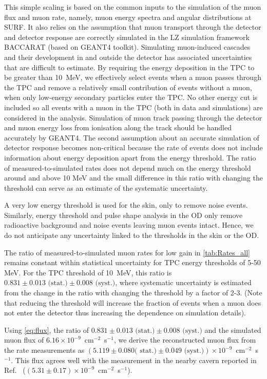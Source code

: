 This simple scaling is based on the common inputs to the simulation of the muon flux and muon rate, namely, muon energy spectra and angular distributions at SURF. It also relies on the assumption that muon transport through the detector and detector response are correctly simulated in the LZ simulation framework BACCARAT (based on GEANT4 toolkit). Simulating muon-induced cascades and their development in and outside the detector has associated uncertainties that are difficult to estimate. By requiring the energy deposition in the TPC to be greater than 10~MeV, we effectively select events when a muon passes through the TPC and remove a relatively small contribution of events without a muon, when only low-energy secondary particles enter the TPC. No other energy cut is included so all events with a muon in the TPC (both in data and simulations) are considered in the analysis. Simulation of muon track passing through the detector and muon energy loss from ionisation along the track should be handled accurately by GEANT4. The second assumption about an accurate simulation of detector response becomes non-critical because the rate of events does not include information about energy deposition apart from the energy threshold. The ratio of measured-to-simulated rates does not depend much on the energy threshold around and above 10 MeV and the small difference in this ratio with changing the threshold can serve as an estimate of the systematic uncertainty. 

A very low energy threshold is used for the skin, only to remove noise events. Similarly, energy threshold and pulse shape analysis in the OD only remove radioactive background and noise events leaving muon events intact. Hence, we do not anticipate any uncertainty linked to the thresholds in the skin or the OD.

The ratio of measured-to-simulated muon rates for low gain in \autoref{tab:Rates_all} remains constant within statistical uncertainty for TPC energy thresholds of 5-50 MeV. For the TPC threshold of 10~MeV, this ratio is $0.831 \pm 0.013 \textrm{ (stat.)} \pm 0.008 \textrm{ (syst.)}$, where systematic uncertainty is estimated from the change in the ratio with changing the threshold by a factor of 2-3. (Note that reducing the threshold will increase the fraction of events when a muon does not enter the detector thus increasing the dependence on simulation details).

Using \autoref{eq:flux}, the ratio of $0.831 \pm 0.013 \textrm{ (stat.)} \pm 0.008 \textrm{ (syst.)}$ and the simulated muon flux of $6.16 \times10^{-9}$~cm$^{-2}$~s$^{-1}$, we derive the reconstructed muon flux from the rate measurements as $(5.119 \pm 0.080 \textrm{( stat.)} \pm 0.049 \textrm{ (syst.)})\times10^{-9}$~cm$^{-2}$~s$^{-1}$. This flux agrees well with the measurement in the nearby cavern reported in Ref.~\cite{majorana} ($(5.31 \pm 0.17)\times10^{-9}$~cm$^{-2}$~s$^{-1}$).

